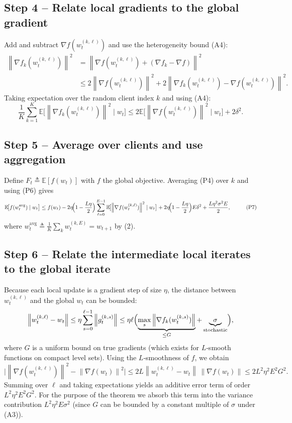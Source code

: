 \documentclass{article}
\newcommand{\E}{\mathbb{E}}
\newcommand{\norm}[1]{\left\lVert #1\right\rVert}
\begin{document}
\subsection*{Step 4 – Relate local gradients to the global gradient}
Add and subtract $\nabla f(w_{t}^{(k,\ell)})$ and use the heterogeneity bound (A4):
\[
\begin{aligned}
\norm{\nabla f_k(w_{t}^{(k,\ell)})}^{2}
&= \norm{\nabla f(w_{t}^{(k,\ell)}) + (\nabla f_k-\nabla f)}^{2} \\
&\le 2\norm{\nabla f(w_{t}^{(k,\ell)})}^{2}
   + 2\norm{\nabla f_k(w_{t}^{(k,\ell)})-\nabla f(w_{t}^{(k,\ell)})}^{2}.
\end{aligned}
\tag{P5}
\]
Taking expectation over the random client index $k$ and using (A4):
\[
\frac1K\sum_{k=1}^{K}
\E\!\bigl[\norm{\nabla f_k(w_{t}^{(k,\ell)})}^{2}\mid w_t\bigr]
\le 2\E\!\bigl[\norm{\nabla f(w_{t}^{(k,\ell)})}^{2}\mid w_t\bigr] + 2\delta^{2}.
\tag{P6}
\]

\subsection*{Step 5 – Average over clients and use aggregation}
Define $F_t \triangleq \E[f(w_t)]$ with $f$ the global objective.  
Averaging (P4) over $k$ and using (P6) gives
\[
\begin{aligned}
\E\!\bigl[f(w_{t}^{\text{avg}})\mid w_t\bigr]
&\le f(w_t)
   - 2\eta\!\Bigl(1-\frac{L\eta}{2}\Bigr)
        \sum_{\ell=0}^{E-1}
        \E\!\bigl[\norm{\nabla f(w_{t}^{(k,\ell)})}^{2}\mid w_t\bigr]
   + 2\eta\!\Bigl(1-\frac{L\eta}{2}\Bigr)E\delta^{2}
   + \frac{L\eta^{2}\sigma^{2}E}{2},
\end{aligned}
\tag{P7}
\]
where $w_{t}^{\text{avg}} \triangleq \frac1K\sum_{k} w_{t}^{(k,E)} = w_{t+1}$ by (2).

\subsection*{Step 6 – Relate the intermediate local iterates to the global iterate}
Because each local update is a gradient step of size $\eta$, the distance between $w_{t}^{(k,\ell)}$ and the global $w_t$ can be bounded:
\[
\norm{w_{t}^{(k,\ell)}-w_t}
\le \eta\sum_{s=0}^{\ell-1}\norm{g_{t}^{(k,s)}}
\le \eta\ell\Bigl(\underbrace{\max_{s}\norm{\nabla f_k(w_{t}^{(k,s)})}}_{\le G} + \underbrace{\sigma}_{\text{stochastic}}\Bigr),
\]
where $G$ is a uniform bound on true gradients (which exists for $L$‑smooth functions on compact level sets).  
Using the $L$‑smoothness of $f$, we obtain
\[
\bigl|\norm{\nabla f(w_{t}^{(k,\ell)})}^{2} - \norm{\nabla f(w_t)}^{2}\bigr|
\le 2L\norm{w_{t}^{(k,\ell)}-w_t}\,\norm{\nabla f(w_t)} \le 2L^{2}\eta^{2}E^{2}G^{2}.
\]
Summing over $\ell$ and taking expectations yields an additive error term of order $L^{2}\eta^{2}E^{2}G^{2}$. For the purpose of the theorem we absorb this term into the variance contribution $L^{2}\eta^{2}E\sigma^{2}$ (since $G$ can be bounded by a constant multiple of $\sigma$ under (A3)).  
\end{document}
